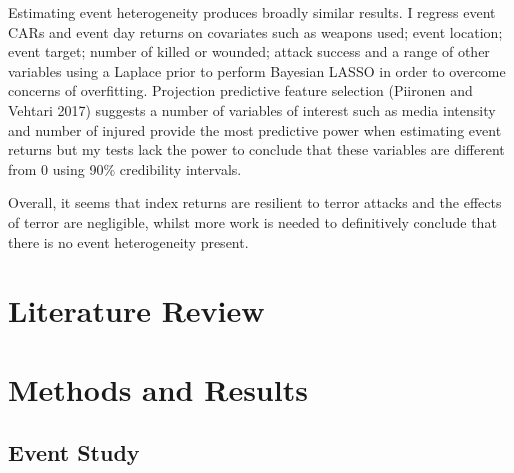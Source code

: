 \documentclass[]{AEA}
\begin{document}
Estimating event heterogeneity produces broadly similar results. I
regress event CARs and event day returns on covariates such as weapons
used; event location; event target; number of killed or wounded; attack
success and a range of other variables using a Laplace prior to perform
Bayesian LASSO in order to overcome concerns of overfitting. Projection
predictive feature selection (Piironen and Vehtari 2017) suggests a
number of variables of interest such as media intensity and number of
injured provide the most predictive power when estimating event returns
but my tests lack the power to conclude that these variables are
different from 0 using 90\% credibility intervals.

Overall, it seems that index returns are resilient to terror attacks and
the effects of terror are negligible, whilst more work is needed to
definitively conclude that there is no event heterogeneity present.

\section{Literature Review}

\section{Methods and Results}\subsection{Event Study}
\end{document}

